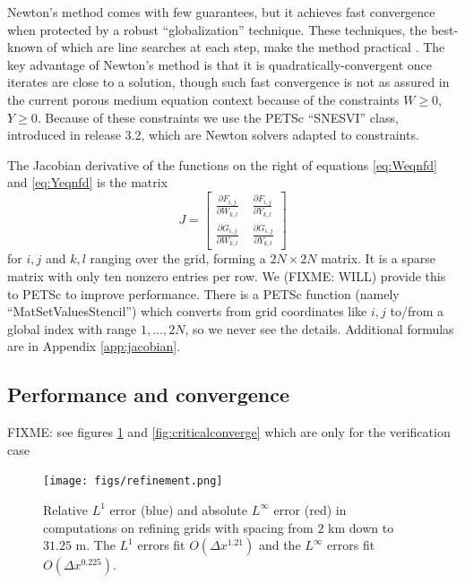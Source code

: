 \documentclass[11pt]{amsart}
\begin{document}
Newton's method comes with few guarantees, but it achieves fast convergence when protected by a robust ``globalization'' technique.  These techniques, the best-known of which are line searches at each step, make the method practical \citep{Kelley}.  The key advantage of Newton's method is that it is quadratically-convergent once iterates are close to a solution, though such fast convergence is not as assured in the current porous medium equation context because of the constraints $W\ge 0$, $Y\ge 0$.  Because of these constraints we use the PETSc ``SNESVI'' class, introduced in release 3.2, which are Newton solvers adapted to constraints.

The Jacobian derivative of the functions on the right of equations \eqref{eq:Weqnfd} and \eqref{eq:Yeqnfd} is the matrix
	$$J = \begin{bmatrix} \frac{\partial F_{i,j}}{\partial W_{k,l}}\phantom{\bigg|} & \frac{\partial F_{i,j}}{\partial Y_{k,l}} \\
	                      \frac{\partial G_{i,j}}{\partial W_{k,l}}\phantom{\bigg|} & \frac{\partial G_{i,j}}{\partial Y_{k,l}} \end{bmatrix}$$
for $i,j$ and $k,l$ ranging over the grid, forming a $2N\times 2N$ matrix.  It is a sparse matrix with only ten nonzero entries per row.  We (FIXME: WILL) provide this to PETSc to improve performance.  There is a PETSc function (namely ``MatSetValuesStencil'') which converts from grid coordinates like $i,j$ to/from a global index with range $1,\dots,2N$, so we never see the details.  Additional formulas are in Appendix \ref{app:jacobian}.



\subsection*{Performance and convergence} FIXME: see figures \ref{fig:refinement} and \ref{fig:criticalconverge} which are only for the verification case

\begin{figure}[ht]
\centering
\texttt{[image: figs/refinement.png]}
\caption{Relative $L^1$ error (blue) and absolute $L^\infty$ error (red) in computations on refining grids with spacing from $2$ km down to $31.25$ m.  The $L^1$ errors fit $O(\Delta x^{1.21})$ and the $L^\infty$ errors fit $O(\Delta x^{0.225})$.}
\label{fig:refinement}
\end{figure}
\end{document}

